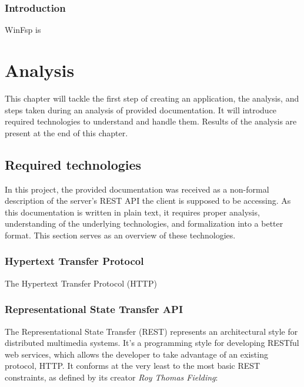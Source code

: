 \newpage
\subsection*{Introduction}
WinFsp is

\chapter{Analysis}
\label{ch4}
This chapter will tackle the first step of creating an application, the analysis, and steps taken during an analysis of provided documentation. It will introduce required technologies to understand and handle them. Results of the analysis are present at the end of this chapter.


\section{Required technologies}
In this project, the provided documentation was received as a non-formal description of the server's REST API the client is supposed to be accessing. As this documentation is written in plain text, it requires proper analysis, understanding of the underlying technologies, and formalization into a better format. This section serves as an overview of these technologies.

\subsection*{Hypertext Transfer Protocol}
The Hypertext Transfer Protocol (HTTP) 

\cite{MozillaHTTP}

\subsection*{Representational State Transfer API}
The Representational State Transfer (REST) represents an architectural style for distributed multimedia systems. It's a programming style for developing RESTful web services, which allows the developer to take advantage of an existing protocol, HTTP. It conforms at the very least to the most basic REST constraints, as defined by its creator \textit{Roy Thomas Fielding}:

